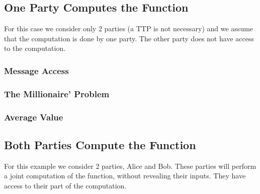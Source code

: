 \subsection{One Party Computes the Function}
For this case we consider only 2 parties (a TTP is not necessary) and we assume that the computation is done by one party.
The other party does not have access to the computation.

\subsubsection{Message Access}
\subsubsection{The Millionaire' Problem}
\subsubsection{Average Value}

\subsection{Both Parties Compute the Function}
For this example we consider 2 parties, Alice and Bob. These parties will perform a joint computation of the function, without revealing
their inputs. They have access to their part of the computation.

